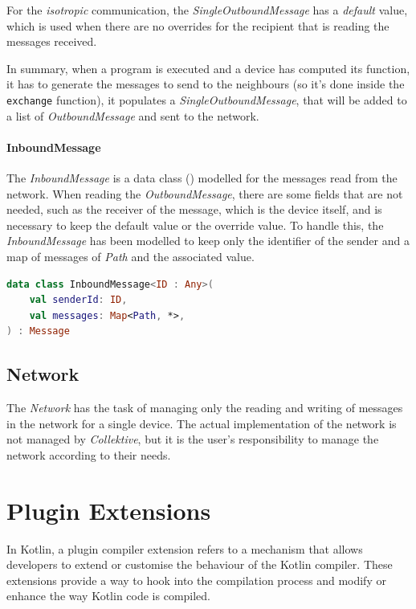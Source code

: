 For the \emph{isotropic} communication, the \emph{SingleOutboundMessage} has a \emph{default} value, which is used
when there are no overrides for the recipient that is reading the messages received.

In summary, when a program is executed and a device has computed its function, it has to generate the messages to send to
the neighbours (so it's done inside the \texttt{exchange} function), it populates a \emph{SingleOutboundMessage},
that will be added to a list of \emph{OutboundMessage} and sent to the network.

\paragraph{InboundMessage}
The \emph{InboundMessage} is a data class () modelled for the messages read from the network.
When reading the \emph{OutboundMessage}, there are some fields that are not needed, such as the receiver of the message,
which is the device itself, and is necessary to keep the default value or the override value.
To handle this, the \emph{InboundMessage} has been modelled to keep only the identifier of the sender and
a map of messages of \emph{Path} and the associated value.

\begin{lstlisting}[language=kt,label={lst:inbound}, caption={Inbound message data class.}]
data class InboundMessage<ID : Any>(
    val senderId: ID,
    val messages: Map<Path, *>,
) : Message
\end{lstlisting}

\subsection{Network}
\label{subsec:network}
The \emph{Network} has the task of managing only the reading and writing of messages in the network for a single device.
The actual implementation of the network is not managed by \emph{Collektive}, but it is the user's responsibility to manage
the network according to their needs.


\section{Plugin Extensions}
\label{sec:plugin-extensions}
In Kotlin, a plugin compiler extension refers to a mechanism that allows developers to extend or customise the behaviour
of the Kotlin compiler.
These extensions provide a way to hook into the compilation process and modify or enhance the way Kotlin code is compiled.

